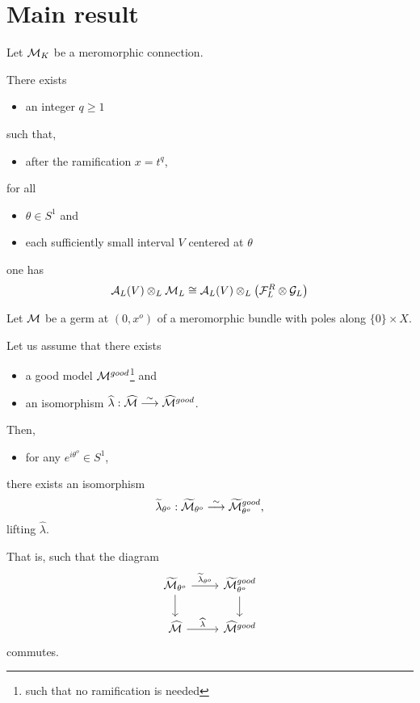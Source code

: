 \section{Main result}
\begin{paracol}{2} %
  Let $\mathcal{M}_K$ be a meromorphic connection.
  \begin{thm}
    There exists
    \begin{itemize}
      \item an integer $q\geq 1$
    \end{itemize}
    such that,
    \begin{itemize}
      \item after the ramification $x=t^q$,
    \end{itemize}
    for all
    \begin{itemize}
      \item $\theta\in S^1$ and
      \item each sufficiently small interval $V$ centered at $\theta$
    \end{itemize}
    one has
    \[
      \mathcal{A}_L(V)\otimes_L\mathcal{M}_L \cong
        \mathcal{A}_L(V)\otimes_L\left(\mathcal{F}_L^R\otimes\mathcal{G}_L\right)
    \]
  \end{thm}
  \switchcolumn{} %
  Let $\mathcal{M}$ be a germ at $(0,x^o)$ of a meromorphic bundle with poles along
  $\{0\}\times X$.
  \begin{thm} \label{thm:sectDecomp}
    Let us assume that there exists
    \begin{itemize}
      \item a good model $\mathcal{M}^{good}$\footnote{such that no ramification is
        needed} and
      \item an isomorphism $\widehat\lambda: \widehat{\mathcal{M}}
        \overset{\sim}{\longrightarrow}\widehat{\mathcal{M}}^{good}$.
    \end{itemize}
    Then,
    \begin{itemize}
      \item for any $e^{i\theta^o}\in S^1$,
    \end{itemize}
    there exists an isomorphism
    \[
      \widetilde\lambda_{\theta^o}: \widetilde{\mathcal{M}}_{\theta^o}
      \overset{\sim}{\longrightarrow}\widetilde{\mathcal{M}}^{good}_{\theta^o},
    \]
    lifting $\hat\lambda$.
  \end{thm}
  That is, such that the diagram
  \[ \begin{tikzcd}
      \tilde\cM_{\theta^o} \dar \rar{\tilde\lambda_{\theta^o}} &
        \tilde\cM^{good}_{\theta^o} \dar
        \\\hat\cM \rar{\hat\lambda} &
        \hat\cM^{good}
  \end{tikzcd} \]
  commutes.
\end{paracol} %

